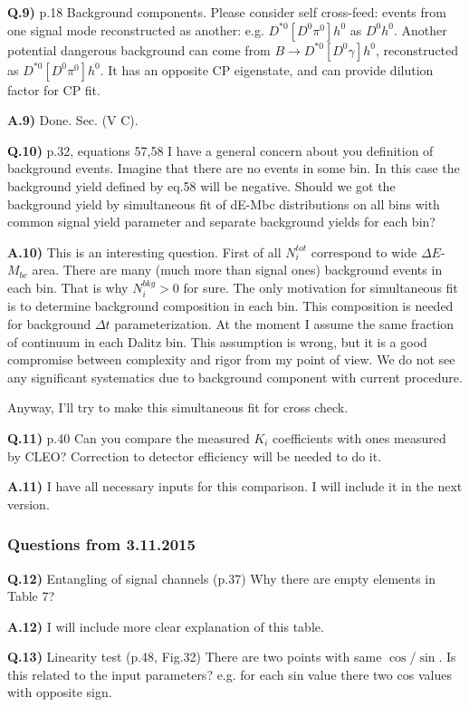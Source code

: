 \documentclass[a4paper,12pt]{article}
\begin{document}
{\bf Q.9)} p.18 Background components.
Please consider self cross-feed: events from one signal mode reconstructed as another: e.g. $D^{*0}[D^0\pi^0] h^0$ as $D^0 h^0$.
Another potential dangerous background can come from $B\to D^{*0}[D^0 \gamma] h^0$, reconstructed as $D^{*0}[D^0\pi^0] h^0$.
It has an opposite CP eigenstate, and can provide dilution factor for CP fit.

{\bf A.9)} Done. Sec. (V C).

{\bf Q.10)} p.32, equations 57,58
I have a general concern about you definition of background events. Imagine that there are no events in some bin. In this case the background yield defined by eq.58 will be negative. Should we got the background yield by simultaneous fit of dE-Mbc distributions on all bins with common signal yield parameter and separate background yields for each bin?

{\bf A.10)} This is an interesting question. First of all $N_{i}^{tot}$ correspond to wide $\Delta E$-$M_{bc}$ area. There are many (much more than signal ones) background events in each bin. That is why $N_{i}^{bkg}>0$ for sure. The only motivation for simultaneous fit is to determine background composition in each bin. This composition is needed for background $\Delta t$ parameterization. At the moment I assume the same fraction of continuum in each Dalitz bin. This assumption is wrong, but it is a good compromise between complexity and rigor from my point of view. We do not see any significant systematics due to background component with current procedure.

Anyway, I'll try to make this simultaneous fit for cross check.

{\bf Q.11)} p.40 Can you compare the measured $K_i$ coefficients with ones measured by CLEO? Correction to detector efficiency will be needed to do it.

{\bf A.11)} I have all necessary inputs for this comparison. I will include it in the next version.

\subsubsection*{Questions from 3.11.2015}
{\bf Q.12)} Entangling of signal channels (p.37)
Why there are empty elements in Table 7?

{\bf A.12)} I will include more clear explanation of this table.

{\bf Q.13)} Linearity test (p.48, Fig.32)
There are two points with same $\cos$/$\sin$. Is this related to the input parameters? e.g. for each sin value there two cos values with opposite sign.
\end{document}
